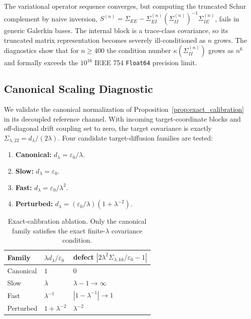 The variational operator sequence converges, but computing the truncated Schur
complement by naive inversion,
$S^{(n)}=\Sigma_{EE}-\Sigma_{EI}^{(n)}(\Sigma_{II}^{(n)})^{-1}
\Sigma_{IE}^{(n)}$, fails in generic Galerkin bases.  The internal block is a
trace-class covariance, so its truncated matrix representation becomes
severely ill-conditioned as $n$ grows.  The diagnostics show that for
$n\ge400$ the condition number $\kappa(\Sigma_{II}^{(n)})$ grows as $n^6$ and
formally exceeds the $10^{16}$ IEEE 754 \texttt{Float64} precision limit.

\subsection{Canonical Scaling Diagnostic}
\label{supp:canonical_scaling}

We validate the canonical normalization of
Proposition~\ref{prop:exact_calibration} in its decoupled reference channel.
With incoming target-coordinate blocks and off-diagonal drift coupling set to
zero, the target covariance is exactly
$\Sigma_{\lambda,22}=d_\lambda/(2\lambda)$. Four candidate target-diffusion
families are tested:
\begin{enumerate}
  \item \textbf{Canonical:} $d_\lambda=\varepsilon_0/\lambda$.
  \item \textbf{Slow:} $d_\lambda=\varepsilon_0$.
  \item \textbf{Fast:} $d_\lambda=\varepsilon_0/\lambda^2$.
  \item \textbf{Perturbed:} $d_\lambda=(\varepsilon_0/\lambda)(1+\lambda^{-2})$.
\end{enumerate}

\begin{table}[htbp]
  \centering
  \caption{Exact-calibration ablation. Only the canonical family satisfies the
  exact finite-$\lambda$ covariance condition.}
  \label{tab:supp_ablation}
  \begin{tabular}{lll}
    \toprule
    Family & $\lambda d_\lambda/\varepsilon_0$ &
    defect $|2\lambda^2\Sigma_{\lambda,kk}/\varepsilon_0-1|$ \\
    \midrule
    Canonical & $1$ & $0$ \\
    Slow & $\lambda$ & $\lambda-1\to\infty$ \\
    Fast & $\lambda^{-1}$ & $|1-\lambda^{-1}|\to1$ \\
    Perturbed & $1+\lambda^{-2}$ & $\lambda^{-2}$ \\
    \bottomrule
  \end{tabular}
\end{table}

